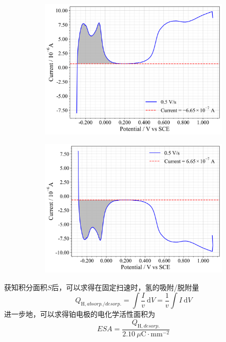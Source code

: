 \begin{figure}[htbp]
\begin{subfigure}{0.49\textwidth}
        \includegraphics[width=\linewidth]{figures2/5-5.png}
    \end{subfigure}
    \hfill
    \begin{subfigure}{0.49\textwidth}
        \centering
        \includegraphics[width=\linewidth]{figures2/5-6.png}
    \end{subfigure}
    \label{fig:5}
\end{figure}

获知积分面积$S$后，可以求得在固定扫速时，氢的吸附/脱附量
\begin{equation}\label{eq:1}
    Q_{\mathrm{H},absorp./desorp.}=\int \frac{I}{v} \mathrm{~d} V= \frac{1}{v}\int I\mathrm{~d} V
\end{equation}
进一步地，可以求得铂电极的电化学活性面积\cite{pcl2002}为
\begin{equation}\label{eq:2}
    E S A=\frac{Q_{\mathrm{H},desorp.}}{2.10 ~\mu \mathrm{C} \cdot \mathrm{mm}^{-2}}
\end{equation}

